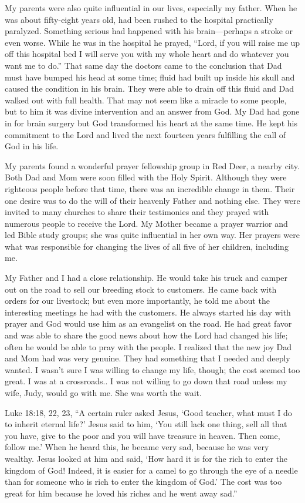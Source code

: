 \documentclass[twoside, 12pt]{book}
\begin{document}
My parents were also quite influential in our lives, especially my father. When he was about fifty-eight years old, had been rushed to the hospital practically paralyzed. Something serious had happened with his brain—perhaps a stroke or even worse. While he was in the hospital he prayed, “Lord, if you will raise me up off this hospital bed I will serve you with my whole heart and do whatever you want me to do.” That same day the doctors came to the conclusion that Dad must have bumped his head at some time; fluid had built up inside his skull and caused the condition in his brain. They were able to drain off this fluid and Dad walked out with full health. That may not seem like a miracle to some people, but to him it was divine intervention and an answer from God. My Dad had gone in for brain surgery but God transformed his heart at the same time. He kept his commitment to the Lord and lived the next fourteen years fulfilling the call of God in his life.

My parents found a wonderful prayer fellowship group in Red Deer, a nearby city. Both Dad and Mom were soon filled with the Holy Spirit. Although they were righteous people before that time, there was an incredible change in them. Their one desire was to do the will of their heavenly Father and nothing else. They were invited to many churches to share their testimonies and they prayed with numerous people to receive the Lord. My Mother became a prayer warrior and led Bible study groups; she was quite influential in her own way. Her prayers were what was responsible for changing the lives of all five of her children, including me.

My Father and I had a close relationship. He would take his truck and camper out on the road to sell our breeding stock to customers. He came back with orders for our livestock; but even more importantly, he told me about the interesting meetings he had with the customers. He always started his day with prayer and God would use him as an evangelist on the road. He had great favor and was able to share the good news about how the Lord had changed his life; often he would be able to pray with the people. I realized that the new joy Dad and Mom had was very genuine. They had something that I needed and deeply wanted. I wasn't sure I was willing to change my life, though; the cost seemed too great. I was at a crossroads.. I was not willing to go down that road unless my wife, Judy, would go with me. She was worth the wait.

Luke 18:18, 22, 23,  “A certain ruler asked Jesus, ‘Good teacher, what must I do to inherit eternal life?' Jesus said to him, ‘You still lack one thing, sell all that you have, give to the poor and you will have treasure in heaven. Then come, follow me.’ When he heard this, he became very sad, because he was very wealthy. Jesus looked at him and said, ‘How hard it is for the rich to enter the kingdom of God! Indeed, it is easier for a camel to go through the eye of a needle than for someone who is rich to enter the kingdom of God.’ The cost was too great for him because he loved his riches and he went away sad.”
\end{document}
